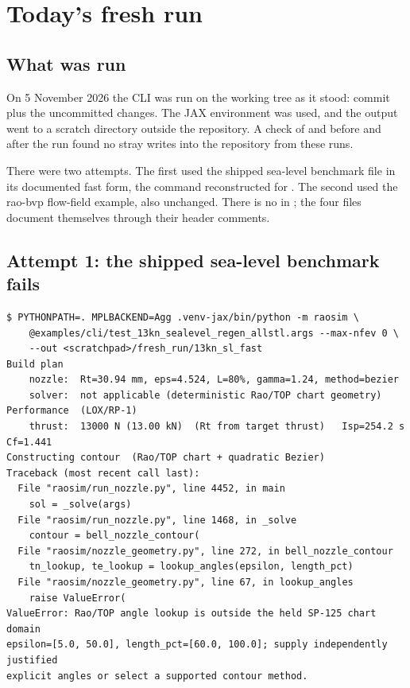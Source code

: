 \section{Today's fresh run}\label{sec:fresh-run}

\subsection{What was run}\label{sec:fresh-run-what}

On 5 November 2026 the CLI was run on the working tree as it stood: commit  plus the uncommitted changes. The JAX environment  was used, and the output went to a scratch directory outside the repository. A check of  and   before and after the run found no stray writes into the repository from these runs.

There were two attempts. The first used the shipped sea-level benchmark file in its documented fast form, the command reconstructed for . The second used the rao-bvp flow-field example, also unchanged. There is no  in ; the four  files document themselves through their header comments.

\subsection{Attempt 1: the shipped sea-level benchmark fails}\label{sec:fresh-run-fail}

\begin{lstlisting}
$ PYTHONPATH=. MPLBACKEND=Agg .venv-jax/bin/python -m raosim \
    @examples/cli/test_13kn_sealevel_regen_allstl.args --max-nfev 0 \
    --out <scratchpad>/fresh_run/13kn_sl_fast
Build plan
    nozzle:  Rt=30.94 mm, eps=4.524, L=80%, gamma=1.24, method=bezier
    solver:  not applicable (deterministic Rao/TOP chart geometry)
Performance  (LOX/RP-1)
    thrust:  13000 N (13.00 kN)  (Rt from target thrust)   Isp=254.2 s   Cf=1.441
Constructing contour  (Rao/TOP chart + quadratic Bezier)
Traceback (most recent call last):
  File "raosim/run_nozzle.py", line 4452, in main
    sol = _solve(args)
  File "raosim/run_nozzle.py", line 1468, in _solve
    contour = bell_nozzle_contour(
  File "raosim/nozzle_geometry.py", line 272, in bell_nozzle_contour
    tn_lookup, te_lookup = lookup_angles(epsilon, length_pct)
  File "raosim/nozzle_geometry.py", line 67, in lookup_angles
    raise ValueError(
ValueError: Rao/TOP angle lookup is outside the held SP-125 chart domain
epsilon=[5.0, 50.0], length_pct=[60.0, 100.0]; supply independently justified
explicit angles or select a supported contour method.
\end{lstlisting}

